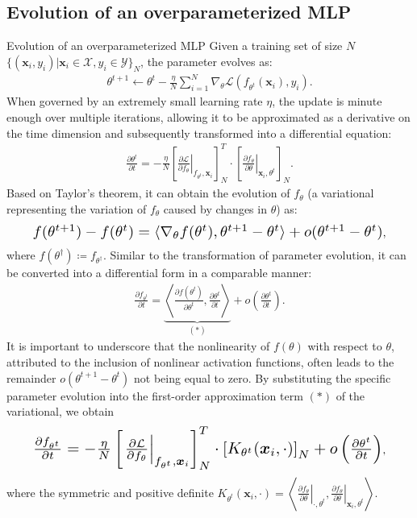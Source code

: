 \documentclass[aspectratio=169,xcolor=dvipsnames]{beamer}
\begin{document}
\iffalse

\subsection{Evolution of an overparameterized MLP}
\begin{frame}{Evolution of an overparameterized MLP}
Given a training set of size $N$ $\{(\bm{x}_i,y_i)|\bm{x}_i\in\mathcal{X},y_i\in\mathcal{Y}\}_N$, the parameter evolves as:
\begin{eqnarray}
	\theta^{t+1}\gets\theta^t-\frac{\eta}{N}\sum_{i=1}^N\nabla_{\theta}\mathcal{L}(f_{\theta^t}(\bm{x}_i),y_i).
\end{eqnarray}
When governed by an extremely small learning rate $\eta$, the update is minute enough over multiple iterations, allowing it to be approximated as a derivative on the time dimension and subsequently transformed into a differential equation:
\begin{eqnarray}
	\frac{\partial\theta^t}{\partial t}=-\frac{\eta}{N}\left[\left.\frac{\partial\mathcal{L}}{\partial f_{\theta}}\right|_{f_{\theta^t},\bm{x}_i}\right]^T_N\cdot \left[\left.\frac{\partial f_{\theta}}{\partial \theta}\right|_{\bm{x}_i,\theta^t}\right]_N.
\end{eqnarray}
Based on Taylor's theorem, it can obtain the evolution of $f_{\theta}$ (a variational representing the variation of $f_{\theta}$ caused by changes in $\theta$) as:
\begin{eqnarray}
	\resizebox{.9\hsize}{!}{$f(\theta^{t+1})-f(\theta^t)=\langle\nabla_{\theta}f(\theta^t),\theta^{t+1}-\theta^t\rangle+o(\theta^{t+1}-\theta^t)$},
\end{eqnarray}
where $f(\theta^\dagger)\coloneqq f_{\theta^\dagger}$. Similar to the transformation of parameter evolution, it can be converted into a differential form in a comparable manner:
\begin{eqnarray} \label{fparat}
	\frac{\partial f_{\theta^t}}{\partial t}= \underbrace{\left\langle\frac{\partial f(\theta^t)}{\partial \theta^t},\frac{\partial \theta^t}{\partial t}\right\rangle}_{(*)} + o\left(\frac{\partial \theta^t}{\partial t}\right).
\end{eqnarray}
It is important to underscore that the nonlinearity of $f(\theta)$ with respect to $\theta$, attributed to the inclusion of nonlinear activation functions, often leads to the remainder $o(\theta^{t+1}-\theta^t)$ not being equal to zero. By substituting the specific parameter evolution into the first-order approximation term $(*)$ of the variational, we obtain%
\begin{eqnarray} \label{bfparat}
	\resizebox{.9\hsize}{!}{$\frac{\partial f_{\theta^t}}{\partial t}=-\frac{\eta}{N}\left[\left.\frac{\partial\mathcal{L}}{\partial f_{\theta}}\right|_{f_{\theta^t},\bm{x}_i}\right]^T_N\cdot\left[K_{\theta^t}(\bm{x}_i,\cdot)\right]_N+ o\left(\frac{\partial \theta^t}{\partial t}\right)$},
\end{eqnarray}
where the symmetric and positive definite $K_{\theta^t}(\bm{x}_i,\cdot)=\left\langle\left.\frac{\partial f_{\theta}}{\partial \theta}\right|_{\cdot,\theta^t},\left.\frac{\partial f_{\theta}}{\partial \theta}\right|_{\bm{x}_i,\theta^t} \right\rangle$.


\end{frame}
\end{document}
